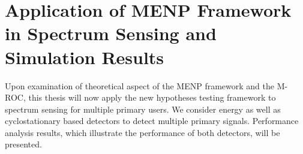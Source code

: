 \chapter{Application of MENP Framework in Spectrum Sensing and Simulation Results}
Upon examination of theoretical aspect of the MENP framework and the M-ROC, this thesis will now apply the new hypotheses testing framework to spectrum sensing for multiple primary users. We consider energy as well as cyclostationary based detectors to detect multiple primary signals. Performance analysis results, which illustrate the performance of both detectors, will be presented. 

\typeout{}




\typeout{}


